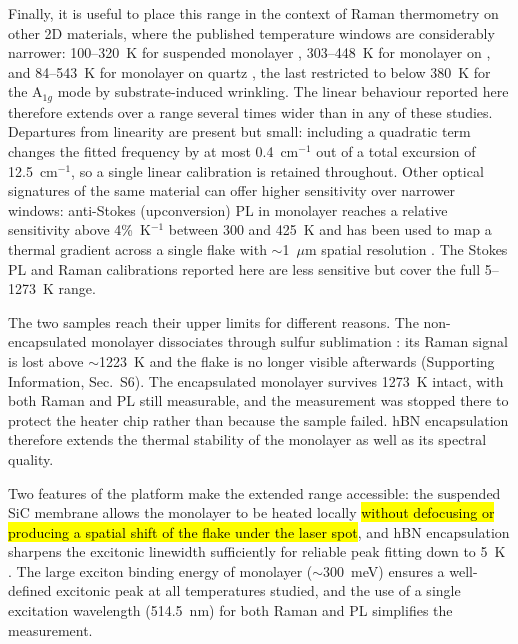 \documentclass[letterpaper]{article}
\DeclareRobustCommand{\rev}[1]{#1}
\DeclareRobustCommand{\revB}[1]{\hl{#1}}
\begin{document}
Finally, it is useful to place this range in the context of Raman thermometry
on other 2D materials, where the published temperature windows are
considerably narrower: 100--320~K for suspended monolayer 
\cite{yan-2014}, 303--448~K for monolayer  on 
\cite{lanzillo-2013}, and 84--543~K for monolayer  on quartz
\cite{huang-2016}, the last restricted to below 380~K for the A$_{1g}$ mode by
substrate-induced wrinkling. The linear behaviour reported here therefore
extends over a range several times wider than in any of these studies.
Departures from linearity are present but small: including a quadratic term
changes the fitted frequency by at most 0.4~cm$^{-1}$ out of a total excursion
of 12.5~cm$^{-1}$, so a single linear calibration is retained throughout.
\rev{Other optical signatures of the same material can offer higher sensitivity
over narrower windows: anti-Stokes (upconversion) PL in monolayer} 
\rev{reaches a relative sensitivity above 4\%~K$^{-1}$ between 300 and 425~K and
has been used to map a thermal gradient across a single flake with $\sim$1~$\mu$m
spatial resolution} \cite{nagarkar-2026}. \rev{The Stokes PL and Raman calibrations
reported here are less sensitive but cover the full 5--1273~K range.}

The two samples reach their upper limits for different reasons. The
non-encapsulated monolayer dissociates through sulfur sublimation
\cite{brainard-1968}: its Raman signal is lost above $\sim$1223~K and the flake
is no longer visible afterwards (Supporting Information, Sec.~S6). The
encapsulated monolayer survives 1273~K intact, with both Raman and PL still
measurable, and the measurement was stopped there to protect the heater chip
rather than because the sample failed. hBN encapsulation therefore extends the
thermal stability of the monolayer as well as its spectral quality.

Two features of the platform make the extended range accessible: the suspended SiC membrane allows the monolayer to
be heated locally \revB{without defocusing or producing a spatial shift of the
flake under the laser spot}, and hBN
encapsulation sharpens the excitonic linewidth sufficiently for reliable peak
fitting down to 5~K \cite{cadiz-2017,ajayi-2017}. The large exciton binding
energy of monolayer  ($\sim$300~meV) \cite{chernikov-2014} ensures a
well-defined excitonic peak at all temperatures studied, and the use of a
single excitation wavelength (514.5~nm) for both Raman and PL simplifies the
measurement.
\end{document}
